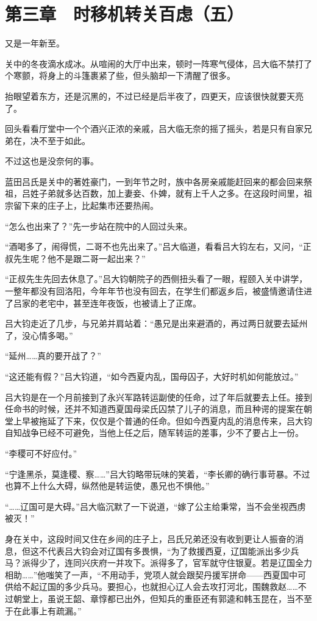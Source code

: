 \section{第三章　时移机转关百虑（五）}

又是一年新至。

关中的冬夜滴水成冰。从喧闹的大厅中出来，顿时一阵寒气侵体，吕大临不禁打了个寒颤，将身上的斗篷裹紧了些，但头脑却一下清醒了很多。

抬眼望着东方，还是沉黑的，不过已经是后半夜了，四更天，应该很快就要天亮了。

回头看看厅堂中一个个酒兴正浓的亲戚，吕大临无奈的摇了摇头，若是只有自家兄弟在，决不至于如此。

不过这也是没奈何的事。

蓝田吕氏是关中的著姓豪门，一到年节之时，族中各房亲戚能赶回来的都会回来祭祖，吕姓子弟就多达百数，加上妻妾、仆婢，就有上千人之多。在这段时间里，祖宗留下来的庄子上，比起集市还要热闹。

“怎么也出来了？”先一步站在院中的人回过头来。

“酒喝多了，闹得慌，二哥不也先出来了。”吕大临道，看看吕大钧左右，又问，“正叔先生呢？他不是跟二哥一起出来？”

“正叔先生先回去休息了。”吕大钧朝院子的西侧扭头看了一眼，程颐入关中讲学，一整年都没有回洛阳，今年年节也没有回去，在学生们都返乡后，被盛情邀请住进了吕家的老宅中，甚至连年夜饭，也被请上了正席。

吕大钧走近了几步，与兄弟并肩站着：“愚兄是出来避酒的，再过两日就要去延州了，没心情多喝。”

“延州……真的要开战了？”

“这还能有假？”吕大钧道，“如今西夏内乱，国母囚子，大好时机如何能放过。”

吕大钧是在一个月前接到了永兴军路转运副使的任命，过了年后就要去上任。接到任命书的时候，还并不知道西夏国母梁氏囚禁了儿子的消息，而且种谔的提案在朝堂上早被拖延了下来，仅仅是个普通的任命。但如今西夏内乱的消息传来，吕大钧自知战争已经不可避免，当他上任之后，随军转运的差事，少不了要占上一份。

“李稷可不好应付。”

“宁逢黑杀，莫逢稷、察……”吕大钧略带玩味的笑着，“李长卿的确行事苛暴。不过也算不上什么大碍，纵然他是转运使，愚兄也不惧他。”

“……辽国可是大碍。”吕大临沉默了一下说道，“嫁了公主给秉常，当不会坐视西虏被灭！”

身在关中，这段时间又住在乡间的庄子上，吕氏兄弟还没有收到更让人振奋的消息，但这不代表吕大钧会对辽国有多畏惧，“为了救援西夏，辽国能派出多少兵马？派得少了，连同兴庆府一并攻下。派得多了，官军就守住银夏。若是辽国全力相助……”他嗤笑了一声，“不用动手，党项人就会跟契丹援军拼命——西夏国中可供给不起辽国的多少兵马。要担心，也就担心辽人会去攻打河北，围魏救赵……不过朝堂上，虽说王韶、章惇都已出外，但知兵的重臣还有郭逵和韩玉昆在，当不至于在此事上有疏漏。”


